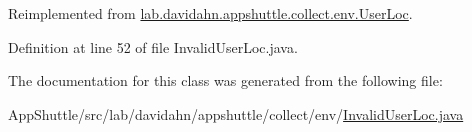 \-Reimplemented from \hyperlink{classlab_1_1davidahn_1_1appshuttle_1_1collect_1_1env_1_1_user_loc_a6ed270496491ed719da528de0ae7f72f}{lab.\-davidahn.\-appshuttle.\-collect.\-env.\-User\-Loc}.



\-Definition at line 52 of file \-Invalid\-User\-Loc.\-java.



\-The documentation for this class was generated from the following file\-:\begin{DoxyCompactItemize}
\item 
\-App\-Shuttle/src/lab/davidahn/appshuttle/collect/env/\hyperlink{_invalid_user_loc_8java}{\-Invalid\-User\-Loc.\-java}\end{DoxyCompactItemize}
